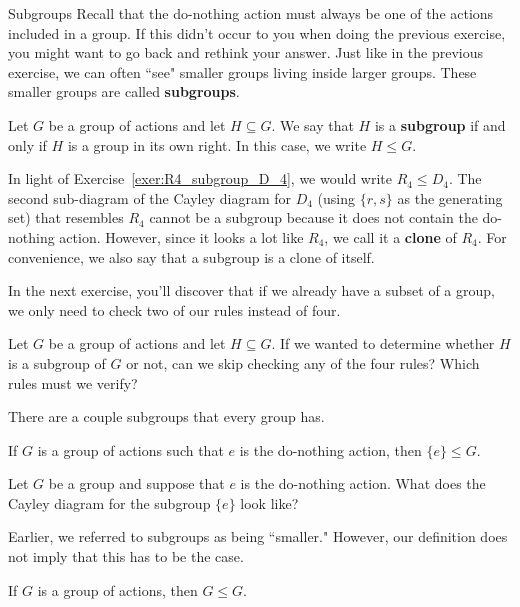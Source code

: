 \begin{section}{Subgroups}
Recall that the do-nothing action must always be one of the actions included in a group.  If this didn't occur to you when doing the previous exercise, you might want to go back and rethink your answer.  Just like in the previous exercise, we can often ``see" smaller groups living inside larger groups.  These smaller groups are called \textbf{subgroups}.

\begin{intuitivedef}
Let $G$ be a group of actions and let $H\subseteq G$.  We say that $H$ is a \textbf{subgroup} if and only if $H$ is a group in its own right.  In this case, we write $H\leq G$.
\end{intuitivedef}

In light of Exercise~\ref{exer:R4_subgroup_D_4}, we would write $R_4\leq D_4$.  The second sub-diagram of the Cayley diagram for $D_4$ (using $\{r,s\}$ as the generating set) that resembles $R_4$ cannot be a subgroup because it does not contain the do-nothing action.  However, since it looks a lot like $R_4$, we call it a \textbf{clone} of $R_4$. For convenience, we also say that a subgroup is a clone of itself.

In the next exercise, you'll discover that if we already have a subset of a group, we only need to check two of our rules instead of four.

\begin{exercise}\label{exer:informal_subgroup_criterion}
Let $G$ be a group of actions and let $H\subseteq G$. If we wanted to determine whether $H$ is a subgroup of $G$ or not, can we skip checking any of the four rules? Which rules must we verify?
\end{exercise}

There are a couple subgroups that every group has.

\begin{theorem}\label{thm:trivial_subgroup}
If $G$ is a group of actions such that $e$ is the do-nothing action, then $\{e\}\leq G$.
\end{theorem}

\begin{exercise}
Let $G$ be a group and suppose that $e$ is the do-nothing action.  What does the Cayley diagram for the subgroup $\{e\}$ look like?
\end{exercise}

Earlier, we referred to subgroups as being ``smaller."  However, our definition does not imply that this has to be the case.

\begin{theorem}\label{thm:improper_subgroup}
If $G$ is a group of actions, then $G\leq G$.
\end{theorem}


\end{section}
